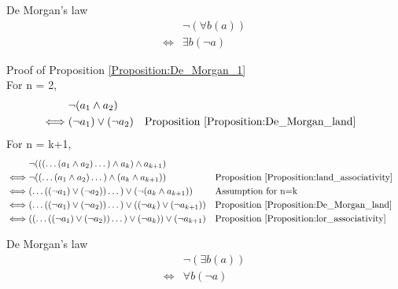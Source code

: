 \begin{prop}
\label{Proposition:De_Morgan_1}
De Morgan's law
\begin{align*}
& \lnot (\forall b (a)) \\
\iff & \exists b (\lnot a)
\end{align*}
\end{prop}

Proof of Proposition \ref{Proposition:De_Morgan_1} \\
For n = 2,
\begin{align*}
& \lnot (a_1 \land a_2) \\
\iff & (\lnot a_1) \lor (\lnot a_2)
& & \text{Proposition \ref{Proposition:De_Morgan_land}} \\
\end{align*}
For n = k+1,
\begin{align*}
& \lnot ((( \dots (a_1 \land a_2) \dots ) \land a_k ) \land a_{k+1}) \\
\iff & \lnot (( \dots (a_1 \land a_2) \dots ) \land ( a_k \land a_{k+1}))
& & \text{Proposition \ref{Proposition:land_associativity}} \\
\iff & ( \dots ((\lnot a_1) \lor (\lnot a_2)) \dots ) \lor (\lnot (a_k \land a_{k+1}))
& & \text{Assumption for n=k} \\
\iff & ( \dots ((\lnot a_1) \lor (\lnot a_2)) \dots ) \lor ((\lnot a_k) \lor (\lnot a_{k+1}))
& & \text{Proposition \ref{Proposition:De_Morgan_land}} \\
\iff & (( \dots ((\lnot a_1) \lor (\lnot a_2)) \dots ) \lor (\lnot a_k)) \lor (\lnot a_{k+1})
& & \text{Proposition \ref{Proposition:lor_associativity}} \\
\end{align*}

\begin{prop}
\label{Proposition:De_Morgan_2}
De Morgan's law
\begin{align*}
& \lnot (\exists b (a)) \\
\iff & \forall b (\lnot a)
\end{align*}
\end{prop}

